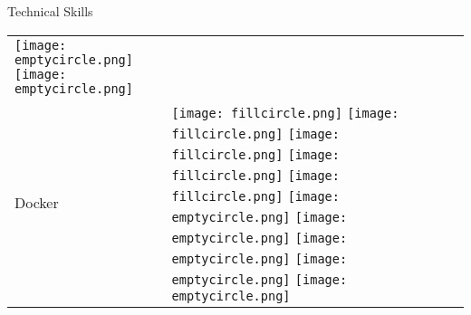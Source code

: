 \documentclass{resume}
\begin{document}
\begin{rSection}{Technical Skills}
\begin{table}[h!]
\begin{tabular}{p{10cm}p{6cm}}
  \texttt{[image: emptycircle.png]} 
  \texttt{[image: emptycircle.png]} \\
  Docker & 
  \texttt{[image: fillcircle.png]} 
  \texttt{[image: fillcircle.png]} 
  \texttt{[image: fillcircle.png]}
  \texttt{[image: fillcircle.png]} 
  \texttt{[image: fillcircle.png]}
  \texttt{[image: emptycircle.png]} 
  \texttt{[image: emptycircle.png]}
  \texttt{[image: emptycircle.png]} 
  \texttt{[image: emptycircle.png]} 
  \texttt{[image: emptycircle.png]} \\
  \end{tabular}
\end{table}



\end{rSection}
\end{document}
